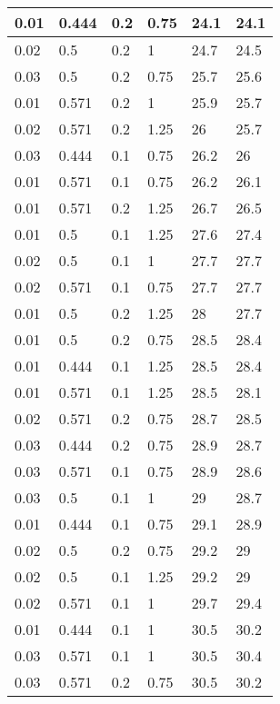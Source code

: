 \documentclass{amsart}
\begin{document}
\begin{center}
\begin{longtable}{| l | l | l | l || l | l |}
		0.01&	0.444&	0.2&	0.75&	24.1&	24.1\\ \hline
		0.02&	0.5&	0.2&	1&	24.7&	24.5\\ \hline
		0.03&	0.5&	0.2&	0.75&	25.7&	25.6\\ \hline
		0.01&	0.571&	0.2&	1&	25.9&	25.7\\ \hline
		0.02&	0.571&	0.2&	1.25&	26&	25.7\\ \hline
		0.03&	0.444&	0.1&	0.75&	26.2&	26\\ \hline
		0.01&	0.571&	0.1&	0.75&	26.2&	26.1\\ \hline
		0.01&	0.571&	0.2&	1.25&	26.7&	26.5\\ \hline
		0.01&	0.5&	0.1&	1.25&	27.6&	27.4\\ \hline
		0.02&	0.5&	0.1&	1&	27.7&	27.7\\ \hline
		0.02&	0.571&	0.1&	0.75&	27.7&	27.7\\ \hline
		0.01&	0.5&	0.2&	1.25&	28&	27.7\\ \hline
		0.01&	0.5&	0.2&	0.75&	28.5&	28.4\\ \hline
		0.01&	0.444&	0.1&	1.25&	28.5&	28.4\\ \hline
		0.01&	0.571&	0.1&	1.25&	28.5&	28.1\\ \hline
		0.02&	0.571&	0.2&	0.75&	28.7&	28.5\\ \hline
		0.03&	0.444&	0.2&	0.75&	28.9&	28.7\\ \hline
		0.03&	0.571&	0.1&	0.75&	28.9&	28.6\\ \hline
		0.03&	0.5&	0.1&	1&	29&	28.7\\ \hline
		0.01&	0.444&	0.1&	0.75&	29.1&	28.9\\ \hline
		0.02&	0.5&	0.2&	0.75&	29.2&	29\\ \hline
		0.02&	0.5&	0.1&	1.25&	29.2&	29\\ \hline
		0.02&	0.571&	0.1&	1&	29.7&	29.4\\ \hline
		0.01&	0.444&	0.1&	1&	30.5&	30.2\\ \hline
		0.03&	0.571&	0.1&	1&	30.5&	30.4\\ \hline
		0.03&	0.571&	0.2&	0.75&	30.5&	30.2\\ \hline
	\end{longtable}
\end{center}	
\end{document}

